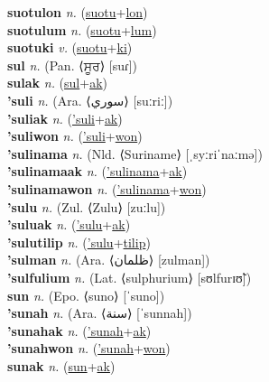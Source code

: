 \textbf{suotulon} \textit{n.} (\hyperref[suotu]{suotu}+\hyperref[lon]{lon})
 \label{suotulon} \\
\textbf{suotulum} \textit{n.} (\hyperref[suotu]{suotu}+\hyperref[lum]{lum})
 \label{suotulum} \\
\textbf{suotuki} \textit{v.} (\hyperref[suotu]{suotu}+\hyperref[ki]{ki})
 \label{suotuki} \\
\textbf{sul} \textit{n.} (Pan. ⟨ਸੂਰ⟩ [suɾ])
 \label{sul} \\
\textbf{sulak} \textit{n.} (\hyperref[sul]{sul}+\hyperref[ak]{ak})
 \label{sulak} \\
\textbf{'suli} \textit{n.} (Ara. ⟨سوري‎⟩ [suːriː])
 \label{'suli} \\
\textbf{'suliak} \textit{n.} (\hyperref['suli]{'suli}+\hyperref[ak]{ak})
 \label{'suliak} \\
\textbf{'suliwon} \textit{n.} (\hyperref['suli]{'suli}+\hyperref[won]{won})
 \label{'suliwon} \\
\textbf{'sulinama} \textit{n.} (Nld. ⟨Suriname⟩ [ˌsyːriˈnaːmə])
 \label{'sulinama} \\
\textbf{'sulinamaak} \textit{n.} (\hyperref['sulinama]{'sulinama}+\hyperref[ak]{ak})
 \label{'sulinamaak} \\
\textbf{'sulinamawon} \textit{n.} (\hyperref['sulinama]{'sulinama}+\hyperref[won]{won})
 \label{'sulinamawon} \\
\textbf{'sulu} \textit{n.} (Zul. ⟨Zulu⟩ [zuːlu])
 \label{'sulu} \\
\textbf{'suluak} \textit{n.} (\hyperref['sulu]{'sulu}+\hyperref[ak]{ak})
 \label{'suluak} \\
\textbf{'sulutilip} \textit{n.} (\hyperref['sulu]{'sulu}+\hyperref[tilip]{tilip})
 \label{'sulutilip} \\
\textbf{'sulman} \textit{n.} (Ara. ⟨ظلمان⟩ [zulman])
 \label{'sulman} \\
\textbf{'sulfulium} \textit{n.} (Lat. ⟨sulphurium⟩ [sʊlfurɪʊ̃])
 \label{'sulfulium} \\
\textbf{sun} \textit{n.} (Epo. ⟨suno⟩ [ˈsuno])
 \label{sun} \\
\textbf{'sunah} \textit{n.} (Ara. ⟨سنة⟩ [ˈsunnah])
 \label{'sunah} \\
\textbf{'sunahak} \textit{n.} (\hyperref['sunah]{'sunah}+\hyperref[ak]{ak})
 \label{'sunahak} \\
\textbf{'sunahwon} \textit{n.} (\hyperref['sunah]{'sunah}+\hyperref[won]{won})
 \label{'sunahwon} \\
\textbf{sunak} \textit{n.} (\hyperref[sun]{sun}+\hyperref[ak]{ak})
